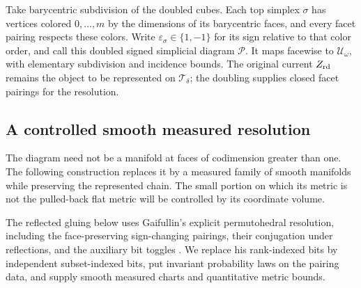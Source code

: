 Take barycentric subdivision of the doubled cubes.  Each top simplex
\(\sigma\) has vertices colored \(0,\ldots,m\) by the dimensions of
its barycentric faces, and every facet pairing respects these colors.
Write \(\varepsilon_\sigma\in\{1,-1\}\) for its sign relative to that
color order, and call this doubled signed simplicial diagram
\(\mathcal P\).  It maps facewise to \(\mathcal U_\omega\), with
elementary subdivision and incidence bounds.  The original current
\(Z_{\rm rd}\) remains the object to be represented on
\(\mathcal T_\delta\); the doubling supplies closed facet pairings
for the resolution.

\subsection{A controlled smooth measured resolution}

The diagram need not be a manifold at faces of codimension greater
than one.  The following construction replaces it by a measured family
of smooth manifolds while preserving the represented chain.  The
small portion on which its metric is not the pulled-back flat metric
will be controlled by its coordinate volume.

The reflected gluing below uses Gaifullin's explicit permutohedral
resolution, including the face-preserving sign-changing pairings,
their conjugation under reflections, and the auxiliary bit toggles
\cite[pp.~562--563]{Gaifullin2008}.  We replace his rank-indexed bits
by independent subset-indexed bits, put invariant probability laws on
the pairing data, and supply smooth measured charts and quantitative
metric bounds.

